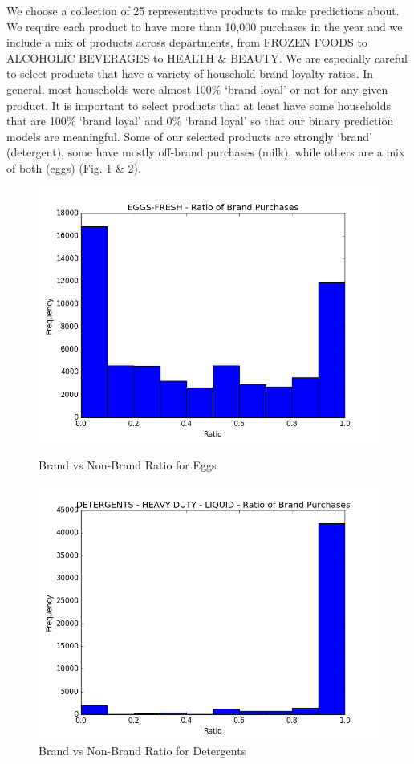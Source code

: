 \documentclass[conference]{IEEEtran}
\begin{document}
We choose a collection of 25 representative products to make predictions about. We require each product to have more than 10,000 purchases in the year and we include a mix of products across departments, from FROZEN FOODS to ALCOHOLIC BEVERAGES to HEALTH \& BEAUTY. We are especially careful to select products that have a variety of household brand loyalty ratios. In general, most households were almost 100\% ‘brand loyal’ or not for any given product. It is important to select products that at least have some households that are 100\% ‘brand loyal’ and 0\% ‘brand loyal’ so that our binary prediction models are meaningful. Some of our selected products are strongly ‘brand’ (detergent), some have mostly off-brand purchases (milk), while others are a mix of both (eggs) (Fig. 1 \& 2).


\begin{figure}[!htb]
  \includegraphics[width=\linewidth]{histogram-1}
  \caption{Brand vs Non-Brand Ratio for Eggs}\label{fig:awesome_image1}
\endminipage\hfill
{}
  \includegraphics[width=\linewidth]{histogram-2}
  \caption{Brand vs Non-Brand Ratio for Detergents}\label{fig:awesome_image2}
\endminipage\hfill
\end{figure}
\end{document}
